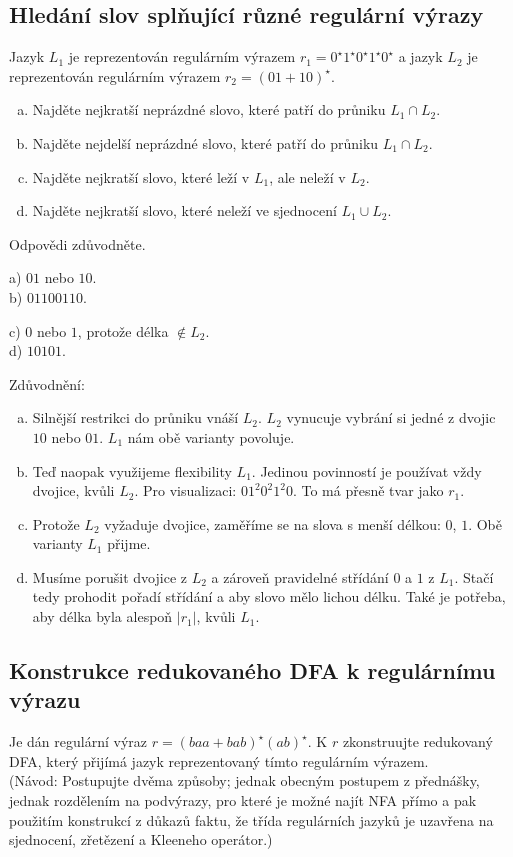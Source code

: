 \subsection{Hledání slov splňující různé regulární výrazy}
Jazyk $L_1$ je reprezentován regulárním výrazem $r_1 = 0^\star1^\star0^\star1^\star0^\star$ a jazyk $L_2$ je reprezentován
regulárním výrazem $r_2 = (01 + 10)^\star$.
\begin{enumerate}[a), noitemsep]
    \item Najděte nejkratší neprázdné slovo, které patří do průniku $L_1 \cap L_2$.
    \item Najděte nejdelší neprázdné slovo, které patří do průniku $L_1 \cap L_2$.
    \item Najděte nejkratší slovo, které leží v $L_1$, ale neleží v $L_2$.
    \item Najděte nejkratší slovo, které neleží ve sjednocení $L_1 \cup L_2$.
\end{enumerate}
Odpovědi zdůvodněte.

\begin{multicols}{2}
    a) $01$ nebo $10$.\\
    b) $01100110$.
\columnbreak

    c) $0$ nebo $1$, protože délka $\not\in L_2$.\\
    d) $10101$.
\end{multicols}
Zdůvodnění:
\begin{enumerate}[a), noitemsep]
    \item Silnější restrikci do průniku vnáší $L_2$. $L_2$ vynucuje vybrání si jedné z dvojic $10$ nebo $01$. $L_1$ nám 
    obě varianty povoluje.
    \item Teď naopak využijeme flexibility $L_1$. Jedinou povinností je používat vždy dvojice, kvůli $L_2$. Pro 
    visualizaci: $0 1^2 0^2 1^2 0$. To má přesně tvar jako $r_1$.
    \item Protože $L_2$ vyžaduje dvojice, zaměříme se na slova s menší délkou: $0$, $1$. Obě varianty $L_1$ přijme.
    \item Musíme porušit dvojice z $L_2$ a zároveň pravidelné střídání $0$ a $1$ z $L_1$. Stačí tedy prohodit pořadí 
    střídání a aby slovo mělo lichou délku. Také je potřeba, aby délka byla alespoň $|r_1|$, kvůli $L_1$. 
\end{enumerate}

\subsection{Konstrukce redukovaného DFA k regulárnímu výrazu}
Je dán regulární výraz $r=(baa + bab)^\star (ab)^\star$. K $r$ zkonstruujte redukovaný DFA, který přijímá jazyk 
reprezentovaný tímto regulárním výrazem.\\
(Návod: Postupujte dvěma způsoby; jednak obecným postupem z přednášky, jednak rozdělením na podvýrazy, pro které je možné
najít NFA přímo a pak použitím konstrukcí z důkazů faktu, že třída regulárních jazyků je uzavřena na sjednocení, zřetězení
a Kleeneho operátor.)

